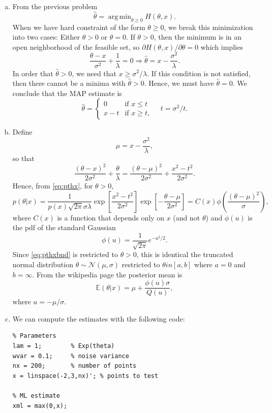 \documentclass[11pt]{article}
\def\beq{\begin{equation}}
\def\eeq{\end{equation}}
\def\argmin{\mathop{\mathrm{arg\,min}}}
\def\Exp{\mathbb{E}}
\def\thetahat{{\widehat{\theta}}}
\begin{document}
\begin{enumerate}
\begin{enumerate}[(a)]
\item 
From the previous problem 
\[
    \thetahat  = \argmin_{\theta \geq 0} H(\theta,x). \label{eq:Hmin}
\]
When we have hard constraint of the form $\theta \geq 0$, we break
this minimization into two cases: Either $\theta > 0$
or $\theta=0$.  If $\theta > 0$, then the minimum is in an open
neighborhood of the feasible set, so 
$\partial H(\theta,x)/\partial \theta = 0$ which implies
\[
    \frac{\theta-x}{\sigma^2} + \frac{1}{\lambda} = 0 
    \Rightarrow \thetahat = x - \frac{\sigma^2}{\lambda}.
\]
In order that $\thetahat > 0$, we need that $x \geq \sigma^2/\lambda$.
If this condition is not satisfied, then there cannot be a minima
with $\thetahat > 0$.  Hence, we must have $\thetahat = 0$.
We conclude that the MAP estimate is
\[
    \thetahat = \begin{cases}
        0           & \mbox{if } x \leq t \\
        x-t  & \mbox{if } x \geq t,
        \end{cases} \quad t = \sigma^2/t.
\]

\item Define
\[
    \mu = x - \frac{\sigma^2}{\lambda},
\]
so that
\[
    \frac{(\theta-x)^2}{2\sigma^2} + \frac{\theta}{\lambda}
    = \frac{(\theta-\mu)^2}{2\sigma^2} + \frac{x^2 - t^2}{2\sigma^2}.
\]
Hence, from \eqref{eq:pthx}, for $\theta > 0$,
\[
    p(\theta|x) = \frac{1}{p(x)\sqrt{2\pi}\sigma \lambda}
    \exp\left[ \frac{x^2 - t^2}{2\sigma^2} \right]
    \exp\left[ -\frac{\theta-\mu}{2\sigma^2} \right]
    = C(x)\phi\left(\frac{(\theta-\mu)^2}{\sigma}\right),
\]
where $C(x)$ is a function that depends only on $x$ 
(and not $\theta$) and $\phi(u)$ is the pdf of the standard Gaussian
\beq \label{eq:pthxbnd}
    \phi(u) = \frac{1}{\sqrt{2\pi}}e^{-u^2/2}.
\eeq
Since \eqref{eq:pthxbnd} is restricted to $\theta > 0$, this
is identical the truncated normal distribution  
$\theta \sim {\mathcal N}(\mu,\sigma)$ restricted to $\theta in [a,b]$
where $a=0$ and $b=\infty$.  From the wikipedia page
the posterior mean is
\[
    \Exp(\theta|x) = \mu + \frac{\phi(u)\sigma}{Q(u)},
\]
where $u=-\mu/\sigma$.

\item We can compute the estimates with the following code:
\begin{lstlisting}
% Parameters
lam = 1;        % Exp(theta)
wvar = 0.1;     % noise variance
nx = 200;       % number of points
x = linspace(-2,3,nx)'; % points to test

% ML estimate
xml = max(0,x);


\end{lstlisting}
\end{enumerate}
\end{enumerate}
\end{document}
